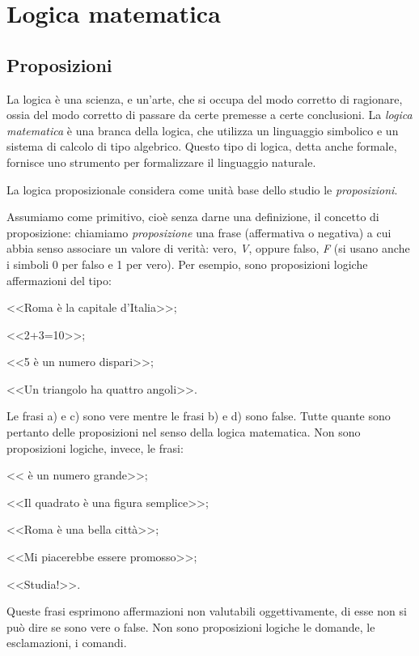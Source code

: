 
\chapter{Logica matematica}

\section{Proposizioni}

La logica è una scienza, e un'arte, che si occupa del modo corretto di ragionare, ossia del modo corretto di passare da certe premesse a certe conclusioni. La \emph{logica matematica} è una branca della logica, che utilizza un linguaggio simbolico e un sistema di calcolo di tipo algebrico. Questo tipo di logica, detta anche formale, fornisce uno strumento per formalizzare il linguaggio naturale.

La logica proposizionale considera come unità base dello studio le \emph{proposizioni}.

Assumiamo come primitivo, cioè senza darne una definizione, il concetto di proposizione: chiamiamo \emph{proposizione} una frase (affermativa o negativa) a cui abbia senso associare un valore di verità: vero, \emph{V}, oppure falso, \emph{F} (si usano anche i simboli 0 per falso e 1 per vero).
Per esempio, sono proposizioni logiche affermazioni del tipo:
\begin{enumeratea}
\item <<Roma è la capitale d'Italia>>;
\item <<2+3=10>>;
\item <<5 è un numero dispari>>;
\item <<Un triangolo ha quattro angoli>>.
\end{enumeratea}
Le frasi a) e c) sono vere mentre le frasi b) e d) sono false. Tutte quante sono pertanto delle proposizioni nel senso della logica matematica.
Non sono proposizioni logiche, invece, le frasi:
\begin{enumeratea}
\item << è un numero grande>>;
\item <<Il quadrato è una figura semplice>>;
\item <<Roma è una bella città>>;
\item <<Mi piacerebbe essere promosso>>;
\item <<Studia!>>.
\end{enumeratea}
Queste frasi esprimono affermazioni non valutabili oggettivamente, di esse non si può dire se sono vere o false. Non sono proposizioni logiche le domande, le esclamazioni, i comandi.


